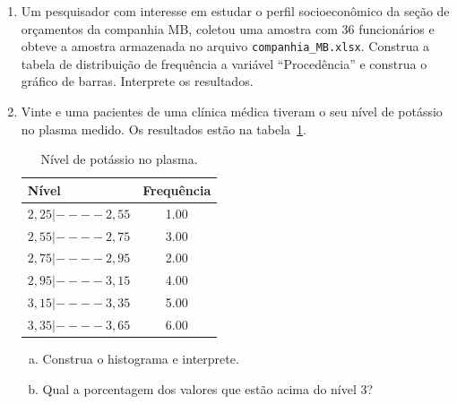 \documentclass[12pt, a4paper]{article}
\begin{document}
\begin{enumerate}[1-]
	\item Um pesquisador com interesse em estudar o perfil socioeconômico da seção de orçamentos da companhia MB, coletou uma amostra com 36 funcionários e obteve a amostra armazenada no 
	arquivo \texttt{companhia\_MB.xlsx}. Construa a tabela de distribuição de frequência a variável ``Procedência'' e construa o gráfico de barras. Interprete os resultados.
	
	\item Vinte e uma pacientes  de uma clínica médica tiveram o seu nível de potássio no plasma medido. Os resultados estão na tabela~\ref{tab:exe3}. 
	\begin{table}[ht]
	\centering
	\begin{tabular}{l|c}
	  \toprule[0.05cm]
	Nível & Frequência \\ 
	  \midrule[0.05cm]
	  $2,25 |---- 2,55$ & 1.00 \\ 
	  $2,55 |---- 2,75$ & 3.00 \\ 
	  $2,75 |---- 2,95$ & 2.00 \\ 
	  $2,95 |---- 3,15$ & 4.00 \\ 
	  $3,15 |---- 3,35$ & 5.00 \\ 
	  $3,35 |---- 3,65$ & 6.00 \\ 
	  \bottomrule[0.05cm]
	\end{tabular}
	\caption{Nível de potássio no plasma.} 
	\label{tab:exe3}
	\end{table}
	\begin{enumerate}[(a)]
	 \item Construa o histograma e interprete.
	 \item Qual a porcentagem dos valores que estão acima do nível 3?
	\end{enumerate}


\end{enumerate}
\end{document}
